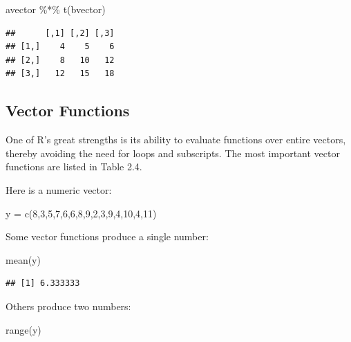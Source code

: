 \documentclass[
]{book}
\newenvironment{Shaded}{\begin{snugshade}}{\end{snugshade}}
\newcommand{\DecValTok}[1]{\textcolor[rgb]{0.00,0.00,0.81}{#1}}
\newcommand{\FunctionTok}[1]{\textcolor[rgb]{0.00,0.00,0.00}{#1}}
\newcommand{\NormalTok}[1]{#1}
\newcommand{\OtherTok}[1]{\textcolor[rgb]{0.56,0.35,0.01}{#1}}
\newcommand{\SpecialCharTok}[1]{\textcolor[rgb]{0.00,0.00,0.00}{#1}}
\begin{document}
\begin{Shaded}
\begin{Highlighting}[]
\NormalTok{avector }\SpecialCharTok{\%*\%} \FunctionTok{t}\NormalTok{(bvector)}
\end{Highlighting}
\end{Shaded}

\begin{verbatim}
##      [,1] [,2] [,3]
## [1,]    4    5    6
## [2,]    8   10   12
## [3,]   12   15   18
\end{verbatim}

\hypertarget{vector-functions}{%
\subsection{Vector Functions}\label{vector-functions}}

One of R's great strengths is its ability to evaluate functions over entire vectors, thereby avoiding the need for loops and subscripts. The most important vector functions are listed in Table 2.4.

Here is a numeric vector:

\begin{Shaded}
\begin{Highlighting}[]
\NormalTok{y }\OtherTok{=} \FunctionTok{c}\NormalTok{(}\DecValTok{8}\NormalTok{,}\DecValTok{3}\NormalTok{,}\DecValTok{5}\NormalTok{,}\DecValTok{7}\NormalTok{,}\DecValTok{6}\NormalTok{,}\DecValTok{6}\NormalTok{,}\DecValTok{8}\NormalTok{,}\DecValTok{9}\NormalTok{,}\DecValTok{2}\NormalTok{,}\DecValTok{3}\NormalTok{,}\DecValTok{9}\NormalTok{,}\DecValTok{4}\NormalTok{,}\DecValTok{10}\NormalTok{,}\DecValTok{4}\NormalTok{,}\DecValTok{11}\NormalTok{)}
\end{Highlighting}
\end{Shaded}

Some vector functions produce a single number:

\begin{Shaded}
\begin{Highlighting}[]
\FunctionTok{mean}\NormalTok{(y)}
\end{Highlighting}
\end{Shaded}

\begin{verbatim}
## [1] 6.333333
\end{verbatim}

Others produce two numbers:

\begin{Shaded}
\begin{Highlighting}[]
\FunctionTok{range}\NormalTok{(y)}
\end{Highlighting}
\end{Shaded}
\end{document}

